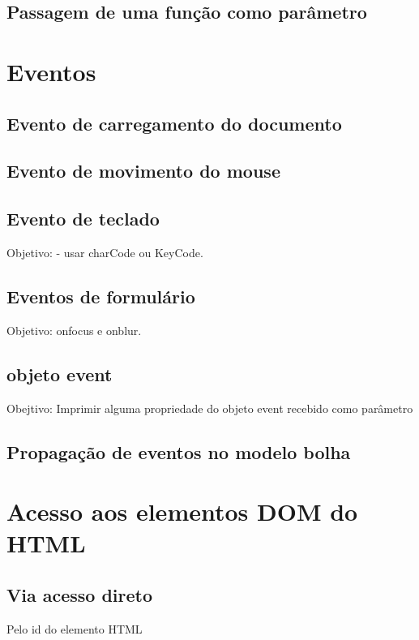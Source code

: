 \subsection{Passagem de uma função como parâmetro}

\section{Eventos}

\subsection{Evento de carregamento do documento}


\subsection{Evento de movimento do mouse}


\subsection{Evento de teclado}
 Objetivo:  - usar charCode ou KeyCode.
 
 
\subsection{Eventos de formulário}
Objetivo: onfocus e onblur.


\subsection{objeto event}
Obejtivo: Imprimir alguma propriedade do objeto event recebido como parâmetro

\subsection{Propagação de eventos no modelo bolha}

\section{Acesso aos elementos DOM do HTML }

\subsection{Via acesso direto}

 Pelo id do elemento HTML
 
